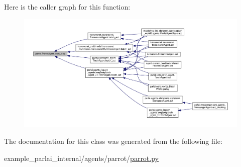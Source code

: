 Here is the caller graph for this function\+:
\nopagebreak
\begin{figure}[H]
\begin{center}
\leavevmode
\includegraphics[width=350pt]{classparrot_1_1ParrotAgent_a85446c6c7698b050d80a2324495c9321_icgraph}
\end{center}
\end{figure}


The documentation for this class was generated from the following file\+:\begin{DoxyCompactItemize}
\item 
example\+\_\+parlai\+\_\+internal/agents/parrot/\hyperlink{parrot_8py}{parrot.\+py}\end{DoxyCompactItemize}
